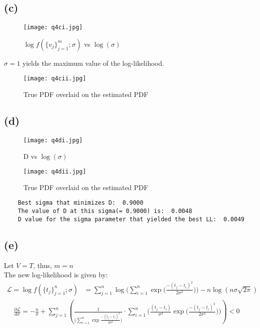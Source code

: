 \documentclass[11pt, fleqn]{article}
\begin{document}
\subsection*{(c)}
\begin{figure}[H]
    \centering
    \texttt{[image: q4ci.jpg]}
    \caption{$\log f(\{v_j\}_{j=1}^{m}; \sigma)$ vs $\log(\sigma)$}
    \label{fig:q4ci}
\end{figure}

$\boxed{\sigma = 1 }$ yields the maximum value of the log-likelihood.

\begin{figure}[H]
    \centering
    \texttt{[image: q4cii.jpg]}
    \caption{True PDF overlaid on the estimated PDF}
    \label{fig:q4cii}
\end{figure}
\newpage

\subsection*{(d)}
\begin{figure}[H]
    \centering
    \texttt{[image: q4di.jpg]}
    \caption{D vs $\log(\sigma)$}
    \label{fig:q4di}
\end{figure}

\begin{figure}[H]
    \centering
    \texttt{[image: q4dii.jpg]}
    \caption{True PDF overlaid on the estimated PDF}
    \label{fig:q4dii}
\end{figure}
\newpage

\begin{verbatim}
    Best sigma that minimizes D:  0.9000
    The value of D at this sigma(= 0.9000) is:  0.0048
    D value for the sigma parameter that yielded the best LL:  0.0049
\end{verbatim}

\subsection*{(e)}
Let $V = T$, thus, $m = n$\\
The new log-likelihood is given by:
$$
\begin{aligned}
    \mathcal{L} = \log f(\{t_j\}_{j=1}^{n}; \sigma) &= \sum_{j=1}^n \log \bigg(\sum_{i=1}^{n}\exp\bigg(\frac{-(t_j - t_i)^2}{2\sigma^2} \bigg)\bigg) - n\log(n\sigma\sqrt{2\pi})
\end{aligned}
$$
$$
\begin{aligned}
    \frac{\partial\mathcal{L}}{d\sigma} = -\frac{n}{\sigma} + \sum_{j=1}^n \left( \frac{1}{\bigg(\sum_{i=1}^{n}\exp\frac{-(t_j - t_i)^2}{2\sigma^2}\bigg)}\cdot \sum_{i=1}^{n}\Bigg(\frac{(t_j - t_i)}{\sigma^3} \exp\bigg(\frac{-(t_j - t_i)^2}{2\sigma^2}\bigg) \Bigg) \right) < 0
\end{aligned}
$$
\end{document}
